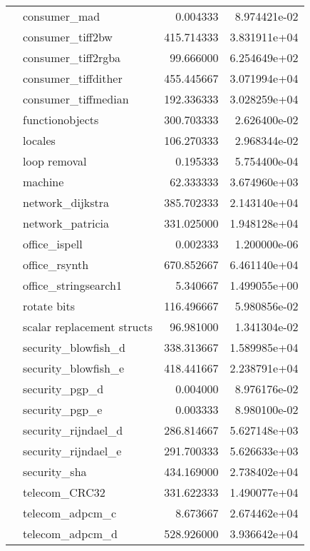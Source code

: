 \begin{table*}
\begin{center}
\begin{tabular}{llrr}
       & consumer\_mad &      0.004333 &  8.974421e-02 \\
       & consumer\_tiff2bw &    415.714333 &  3.831911e+04 \\
       & consumer\_tiff2rgba &     99.666000 &  6.254649e+02 \\
       & consumer\_tiffdither &    455.445667 &  3.071994e+04 \\
       & consumer\_tiffmedian &    192.336333 &  3.028259e+04 \\
       & functionobjects &    300.703333 &  2.626400e-02 \\
       & locales &    106.270333 &  2.968344e-02 \\
       & loop removal &      0.195333 &  5.754400e-04 \\
       & machine &     62.333333 &  3.674960e+03 \\
       & network\_dijkstra &    385.702333 &  2.143140e+04 \\
       & network\_patricia &    331.025000 &  1.948128e+04 \\
       & office\_ispell &      0.002333 &  1.200000e-06 \\
       & office\_rsynth &    670.852667 &  6.461140e+04 \\
       & office\_stringsearch1 &      5.340667 &  1.499055e+00 \\
       & rotate bits &    116.496667 &  5.980856e-02 \\
       & scalar replacement structs &     96.981000 &  1.341304e-02 \\
       & security\_blowfish\_d &    338.313667 &  1.589985e+04 \\
       & security\_blowfish\_e &    418.441667 &  2.238791e+04 \\
       & security\_pgp\_d &      0.004000 &  8.976176e-02 \\
       & security\_pgp\_e &      0.003333 &  8.980100e-02 \\
       & security\_rijndael\_d &    286.814667 &  5.627148e+03 \\
       & security\_rijndael\_e &    291.700333 &  5.626633e+03 \\
       & security\_sha &    434.169000 &  2.738402e+04 \\
       & telecom\_CRC32 &    331.622333 &  1.490077e+04 \\
       & telecom\_adpcm\_c &      8.673667 &  2.674462e+04 \\
       & telecom\_adpcm\_d &    528.926000 &  3.936642e+04 \\

\end{tabular}
\end{center}
\end{table*}
